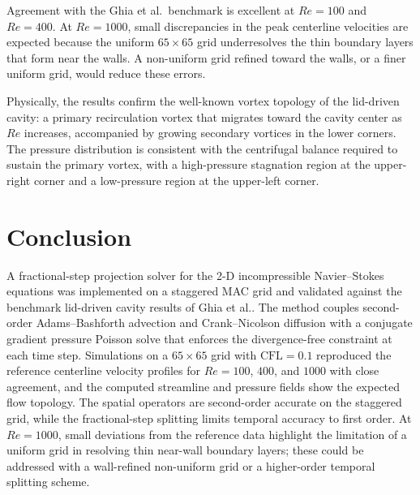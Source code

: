 \documentclass[
  aapm,
  amsmath,amssymb,
  reprint,          %
  floatfix
]{revtex4-2}
\begin{document}
Agreement with the Ghia et al.\ benchmark is excellent at $Re=100$
and $Re=400$. At $Re=1000$, small discrepancies in the peak centerline velocities are
expected because the uniform $65\times65$ grid underresolves the thin boundary layers
that form near the walls. A non-uniform grid refined toward the walls, or a finer
uniform grid, would reduce these errors.

Physically, the results confirm the well-known vortex topology of the lid-driven cavity:
a primary recirculation vortex that migrates toward the cavity center as $Re$ increases,
accompanied by growing secondary vortices in the lower corners. The pressure distribution
is consistent with the centrifugal balance required to sustain the primary vortex, with a
high-pressure stagnation region at the upper-right corner and a low-pressure region at
the upper-left corner.

\section{Conclusion}
%
%
A fractional-step projection solver for the 2-D incompressible Navier--Stokes equations
was implemented on a staggered MAC grid and validated against the benchmark lid-driven
cavity results of Ghia et al.. The method couples second-order
Adams--Bashforth advection and Crank--Nicolson diffusion with a conjugate gradient
pressure Poisson solve that enforces the divergence-free constraint at each time step.
Simulations on a $65\times65$ grid with $\text{CFL}=0.1$ reproduced the reference
centerline velocity profiles for $Re=100$, $400$, and $1000$ with close agreement, and
the computed streamline and pressure fields show the expected flow topology. The spatial
operators are second-order accurate on the staggered grid, while the fractional-step
splitting limits temporal accuracy to first order. At $Re=1000$, small deviations from
the reference data highlight the limitation of a uniform grid in resolving thin near-wall
boundary layers; these could be addressed with a wall-refined non-uniform grid or a
higher-order temporal splitting scheme.




\end{document}
